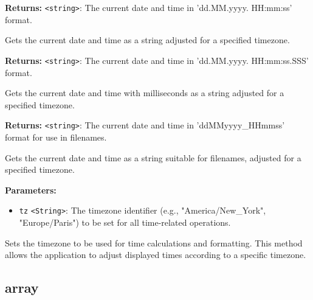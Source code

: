 \documentclass[12pt,a4paper]{article}
\begin{document}
\noindent \textbf{Returns:} \texttt{<string>}: The current date and time in 'dd.MM.yyyy. HH:mm:ss' format.

\noindent Gets the current date and time as a string adjusted for a specified timezone.

\vspace{5mm}
\noindent {}


\noindent \textbf{Returns:} \texttt{<string>}: The current date and time in 'dd.MM.yyyy. HH:mm:ss.SSS' format.

\noindent Gets the current date and time with milliseconds as a string adjusted for a specified timezone.

\vspace{5mm}
\noindent {}


\noindent \textbf{Returns:} \texttt{<string>}: The current date and time in 'ddMMyyyy\_HHmmss' format for use in filenames.

\noindent Gets the current date and time as a string suitable for filenames, adjusted for a specified timezone.

\vspace{5mm}
\noindent {}


\noindent \textbf{Parameters:}
\begin{itemize}
  \item \texttt{tz} \texttt{<String>}: The timezone identifier (e.g., "America/New\_York", "Europe/Paris") to be set for all time-related operations.
\end{itemize}

\noindent Sets the timezone to be used for time calculations and formatting. This method allows the application to adjust displayed times according to a specific timezone.


\subsection{array}
\vspace{5mm}
\noindent {}
\end{document}
